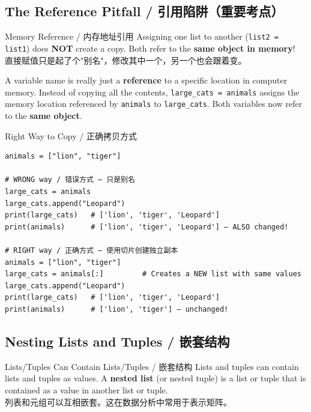 \documentclass[11pt,a4paper]{report}
\let\oldtexttt\texttt
\renewcommand{\texttt}[1]{\textcolor{mainblue}{\oldtexttt{#1}}}
\begin{document}
\subsection{The Reference Pitfall / 引用陷阱（重要考点）}

\begin{warning}{Memory Reference / 内存地址引用}
    Assigning one list to another (\texttt{list2 = list1}) does \textbf{NOT} create a copy. Both refer to the \textbf{same object in memory}! \\
    直接赋值只是起了个"别名"，修改其中一个，另一个也会跟着变。

    A variable name is really just a \textbf{reference} to a specific location in computer memory. Instead of copying all the contents, \texttt{large\_cats = animals} assigns the memory location referenced by \texttt{animals} to \texttt{large\_cats}. Both variables now refer to the \textbf{same object}.
\end{warning}

\begin{examplebox}{Right Way to Copy / 正确拷贝方式}
\begin{lstlisting}
animals = ["lion", "tiger"]

# WRONG way / 错误方式 — 只是别名
large_cats = animals
large_cats.append("Leopard")
print(large_cats)   # ['lion', 'tiger', 'Leopard']
print(animals)      # ['lion', 'tiger', 'Leopard'] — ALSO changed!

# RIGHT way / 正确方式 — 使用切片创建独立副本
animals = ["lion", "tiger"]
large_cats = animals[:]         # Creates a NEW list with same values
large_cats.append("Leopard")
print(large_cats)   # ['lion', 'tiger', 'Leopard']
print(animals)      # ['lion', 'tiger'] — unchanged!
\end{lstlisting}
\end{examplebox}

\subsection{Nesting Lists and Tuples / 嵌套结构}

\begin{concept}{Lists/Tuples Can Contain Lists/Tuples / 嵌套结构}
    Lists and tuples can contain lists and tuples as values. A \textbf{nested list} (or nested tuple) is a list or tuple that is contained as a value in another list or tuple. \\
    列表和元组可以互相嵌套。这在数据分析中常用于表示矩阵。
\end{concept}
\end{document}
